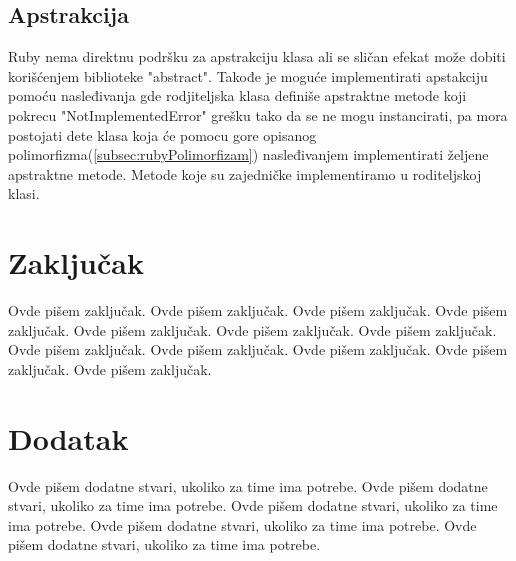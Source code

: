 \documentclass[a4paper]{article}
\begin{document}
\subsection{Apstrakcija}
\label{subsec:rubyApstrakcija}
Ruby nema direktnu podršku za apstrakciju klasa ali se sličan efekat može dobiti korišćenjem biblioteke "abstract". Takođe je moguće implementirati apstakciju pomoću nasleđivanja gde rodjiteljska klasa definiše apstraktne metode koji pokrecu "NotImplementedError" grešku tako da se ne mogu instancirati, pa mora postojati dete klasa koja će pomocu gore opisanog polimorfizma(\ref{subsec:rubyPolimorfizam}) nasleđivanjem implementirati željene apstraktne metode. Metode koje su zajedničke implementiramo u roditeljskoj klasi.


\section{Zaključak}
\label{sec:zakljucak}

Ovde pišem zaključak. 
Ovde pišem zaključak. 
Ovde pišem zaključak. 
Ovde pišem zaključak. 
Ovde pišem zaključak. 
Ovde pišem zaključak. 
Ovde pišem zaključak. 
Ovde pišem zaključak. 
Ovde pišem zaključak. 
Ovde pišem zaključak. 
Ovde pišem zaključak. 
Ovde pišem zaključak. 


\appendix
 


\appendix
\section{Dodatak}
Ovde pišem dodatne stvari, ukoliko za time ima potrebe.
Ovde pišem dodatne stvari, ukoliko za time ima potrebe.
Ovde pišem dodatne stvari, ukoliko za time ima potrebe.
Ovde pišem dodatne stvari, ukoliko za time ima potrebe.
Ovde pišem dodatne stvari, ukoliko za time ima potrebe.
\end{document}
